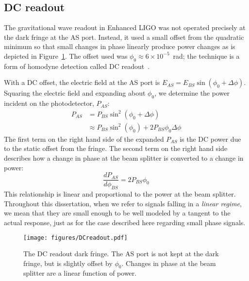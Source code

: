 \subsection{DC readout}
\label{sec:DCreadout}
The gravitational wave readout in Enhanced LIGO was not operated
precisely at the dark fringe at the AS port. Instead, it used a small
offset from the quadratic minimum so that small changes in phase linearly
produce power changes as is depicted in Figure~\ref{fig:DCreadout}. The
offset used was $\phi_0 \approx 6 \times 10^{-5}$~rad; the
technique is a form of homodyne detection called DC readout~\cite{Fricke2011DC}.

With a DC offset, the electric field at the AS port is $E_{AS} =
E_{BS}\sin{(\phi_0 + \Delta\phi)}$. Squaring the electric field and
expanding about $\phi_0$, we determine the power incident on the
photodetector, $P_{AS}$:
\begin{align}
P_{AS} &= P_{BS} \sin^2{(\phi_0 + \Delta\phi)} \\
 &\approx P_{BS}\sin^2{(\phi_0)} + 2P_{BS}\phi_0\Delta\phi
\end{align}
The first term on the right hand side of the expanded $P_{AS}$ is the
DC power due to the static offset from the fringe. The second term on
the right hand side describes how a change in phase at the beam
splitter is converted to a change in power:
\begin{equation}
\frac{d P_{AS}}{d \phi_{BS}} =2 P_{BS} \phi_0 
\label{eq:dP_dphi}
\end{equation}
This relationship is linear and proportional to the power at the beam
splitter. Throughout this dissertation, when we refer to signals
falling in a \emph{linear regime}, we mean that they are small enough
to be well modeled by a tangent to the actual response, just as for
the case described here regarding small phase signals.

\begin{figure}
\begin{centering}
\texttt{[image: figures/DCreadout.pdf]}
\caption[The DC readout dark fringe]{The DC readout dark fringe. The
  AS port is not kept at the dark fringe, but is slightly offset by
  $\phi_0$. Changes in phase at the beam splitter are a linear
  function of power.}
\label{fig:DCreadout}
\end{centering}
\end{figure}



